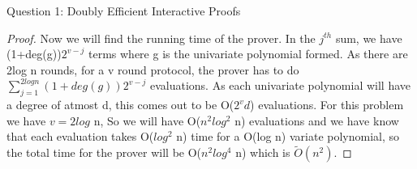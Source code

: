 \begin{solution}{Question 1: Doubly Efficient Interactive Proofs}
\begin{proof}
    Now we will find the running time of the prover. In the $j^{th}$ sum, we have (1+deg(g))$2^{v-j}$ terms where g is the univariate polynomial formed. As there are 2log n rounds, for a v round protocol, the prover has to do $ \sum_{j=1}^{2log n} (1+deg(g))2^{v-j}$ evaluations. As each univariate polynomial will have a degree of atmost d, this comes out to be O($2^vd$) evaluations. For this problem we have $v = 2log$ n, So we will have O($n^2log^2$ n) evaluations and we have know that each evaluation takes O($log^2$ n) time for a O(log n) variate polynomial, so the total time for the prover will be O($n^2log^4$ n) which is $\tilde{O}(n^2)$.
    \end{proof}
\end{solution}
